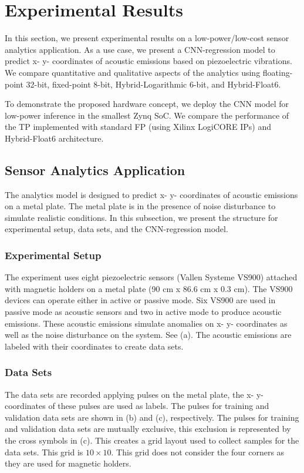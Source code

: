 \section{Experimental Results}
\label{sec:experimental_results}
In this section, we present experimental results on a low-power/low-cost sensor analytics application. As a use case, we present a CNN-regression model to predict x- y- coordinates of acoustic emissions based on piezoelectric vibrations. We compare quantitative and qualitative aspects of the analytics using floating-point 32-bit, fixed-point 8-bit, Hybrid-Logarithmic 6-bit, and Hybrid-Float6.

To demonstrate the proposed hardware concept, we deploy the CNN model for low-power inference in the smallest Zynq SoC. We compare the performance of the TP implemented with standard FP (using Xilinx LogiCORE IPs) and Hybrid-Float6 architecture.

\subsection{Sensor Analytics Application}
The analytics model is designed to predict x- y- coordinates of acoustic emissions on a metal plate. The metal plate is in the presence of noise disturbance to simulate realistic conditions. In this subsection, we present the structure for experimental setup, data sets, and the CNN-regression model.

\subsubsection{Experimental Setup}
The experiment uses eight piezoelectric sensors (Vallen Systeme VS900) attached with magnetic holders on a metal plate (90 cm x 86.6 cm x 0.3 cm). The VS900 devices can operate either in active or passive mode. Six VS900 are used in passive mode as acoustic sensors and two in active mode to produce acoustic emissions. These acoustic emissions simulate anomalies on x- y- coordinates as well as the noise disturbance on the system. See (a). The acoustic emissions are labeled with their coordinates to create data sets.

\subsubsection{Data Sets}
The data sets are recorded applying pulses on the metal plate, the x- y- coordinates of these pulses are used as labels. The pulses for training and validation data sets are shown in (b) and (c), respectively. The pulses for training and validation data sets are mutually exclusive, this exclusion is represented by the cross symbols in (c). This creates a grid layout used to collect samples for the data sets. This grid is $10\times10$. This grid does not consider the four corners as they are used for magnetic holders.

